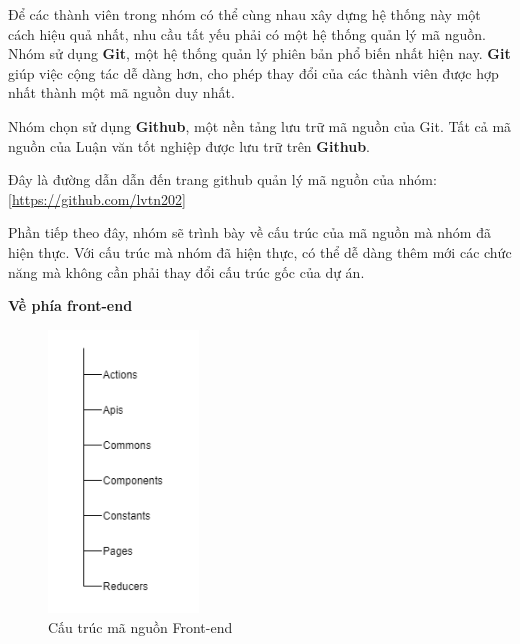 Để các thành viên trong nhóm có thể cùng nhau xây dựng hệ thống này một cách hiệu quả nhất, nhu cầu tất yếu phải có một hệ thống quản lý mã nguồn. Nhóm sử dụng \textbf{Git}, một hệ thống quản lý phiên bản phổ biến nhất hiện nay. \textbf{Git} giúp việc cộng tác dễ dàng hơn, cho phép thay đổi của các thành viên được hợp nhất thành một mã nguồn duy nhất.\par

Nhóm chọn sử dụng \textbf{Github}, một nền tảng lưu trữ mã nguồn của Git. Tất cả mã nguồn của Luận văn tốt nghiệp được lưu trữ trên \textbf{Github}.

Đây là đường dẫn dẫn đến trang github quản lý mã nguồn của nhóm:\\ \href{https://github.com/lvtn202}{[https://github.com/lvtn202]}

Phần tiếp theo đây, nhóm sẽ trình bày về cấu trúc của mã nguồn mà nhóm đã hiện thực. Với cấu trúc mà nhóm đã hiện thực, có thể dễ dàng thêm mới các chức năng mà không cần phải thay đổi cấu trúc gốc của dự án.

\textbf{Về phía front-end}

\begin{figure}[H]
    \begin{center}
        \includegraphics[width=4cm]{Image/Technical/frontend_structure.png}
        \caption{Cấu trúc mã nguồn Front-end}
        \label{frontend_structure}
    \end{center}
\end{figure}

